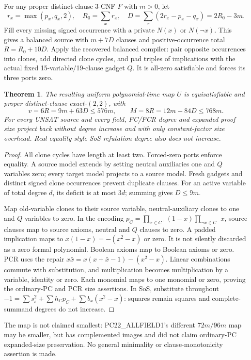 \documentclass[11pt]{article}
\newtheorem{theorem}{Theorem}
\begin{document}
For any proper distinct-clause 3-CNF $F$ with $m>0$, let
\[
r_x=\max(p_x,q_x,2),\quad R_0=\sum_xr_x,\quad
D=\sum_x(2r_x-p_x-q_x)=2R_0-3m.
\]
Fill every missing signed occurrence with a private $N(x)$ or $N(\neg x)$. This gives a balanced source with $m+7D$ clauses and positive-occurrence total $R=R_0+10D$. Apply the recovered balanced compiler: pair opposite occurrences into clones, add directed clone cycles, and pad triples of implications with the actual fixed 15-variable/19-clause gadget $Q$. It is all-zero satisfiable and forces its three ports zero.

\begin{theorem}
The resulting uniform polynomial-time map $U$ is equisatisfiable and proper distinct-clause exact-$(2,2)$, with
\[
v=6R=9m+63D\le576m,\qquad M=8R=12m+84D\le768m.
\]
For every UNSAT source and every field, PC/PCR degree and expanded proof size project back without degree increase and with only constant-factor size overhead. Real equality-style SoS refutation degree also does not increase.
\end{theorem}
\begin{proof}
All clone cycles have length at least two. Forced-zero ports enforce equality. A source model extends by setting neutral auxiliaries one and $Q$ variables zero; every target model projects to a source model. Fresh gadgets and distinct signed clone occurrences prevent duplicate clauses. For an active variable of total degree $d$, its deficit is at most $3d$; summing gives $D\le9m$.

Map old-variable clones to their source variable, neutral-auxiliary clones to one and $Q$ variables to zero. In the encoding $p_C=\prod_{x\in C^+}(1-x)\prod_{\neg x\in C^-}x$, source clauses map to source axioms, neutral and $Q$ clauses to zero. A padded implication maps to $x(1-x)=-(x^2-x)$ or zero. It is not silently discarded as a zero formal polynomial. Boolean axioms map to Boolean axioms or zero. PCR uses the repair $x\bar x=x(x+\bar x-1)-(x^2-x)$. Linear combinations commute with substitution, and multiplication becomes multiplication by a variable, identity or zero. Each monomial maps to one monomial or zero, proving the ordinary-PC and PCR size assertions. In SoS, substitute throughout $-1=\sum s_i^2+\sum h_Cp_C+\sum b_x(x^2-x)$: squares remain squares and complete-summand degrees do not increase.
\end{proof}
The map is not claimed smallest: PC22\_ALLFIELD1's different $72m/96m$ map may be smaller, but has complemented images and did not claim ordinary-PC expanded-size preservation. No general minimality or clause-monotonicity assertion is made.
\end{document}

